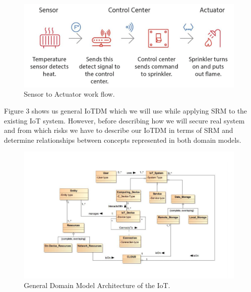 \documentclass[12pt]{article}
\begin{document}
 
 \begin{figure} [H] %
	\begin{center}
	\includegraphics[width=1\textwidth]{simple}
	\caption{Sensor to Actuator work flow.}
	\label{fig:ref_model}
	\end{center}
	\end{figure}
	
\newpage
 Figure 3 shows us general IoTDM which we will use while applying SRM to the existing IoT system. However, before describing how we will secure real system and from which risks we have to describe our IoTDM in terms of SRM and determine relationships between concepts represented in both domain models. 
 
     
 \begin{figure} [H] %
	\begin{center}
	\includegraphics[width=1\textwidth]{IoT_Domain_Model}
	\caption{General Domain Model Architecture of the IoT.}
	\label{fig:ref_model}
	\end{center}
	\end{figure}
	
\end{document}
